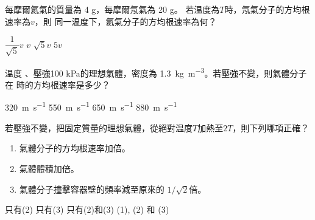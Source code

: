 {
    每摩爾氦氣的質量為 4 g，每摩爾氖氣為 20 g。 若温度為$T$時，氖氣分子的方均根速率為$v$，則 同一温度下，氦氣分子的方均根速率為何？
    \begin{choices}
        \choice $\dfrac{1}{\sqrt{5}}v$
        \choice $v$
        \CorrectChoice $\sqrt{5}v$
        \choice $5v$
    \end{choices}
}{}

{
    温度 、壓強100 kPa的理想氣體，密度為 \qty{1.3}{kg.m^{-3}}。若壓強不變，則氣體分子在  時的方均根速率是多少？
    \begin{choices}
        \choice \qty{320}{m.s^{-1}}
        \CorrectChoice \qty{550}{m.s^{-1}}
        \choice \qty{650}{m.s^{-1}}
        \choice \qty{880}{m.s^{-1}}
    \end{choices}
}{}

{
    若壓強不變，把固定質量的理想氣體，從絕對温度$T$加熱至$2T$，則下列哪項正確？

    \begin{enumerate}[label=\sd]
        \item 氣體分子的方均根速率加倍。
        \item 氣體體積加倍。
        \item 氣體分子撞擊容器壁的頻率減至原來的 $1/\sqrt{2}$倍。
    \end{enumerate}
    \begin{choices}
        \CorrectChoice 只有(2)
        \choice 只有(3)
        \choice 只有(2)和(3)
        \choice (1), (2) 和 (3)
    \end{choices}
}{}